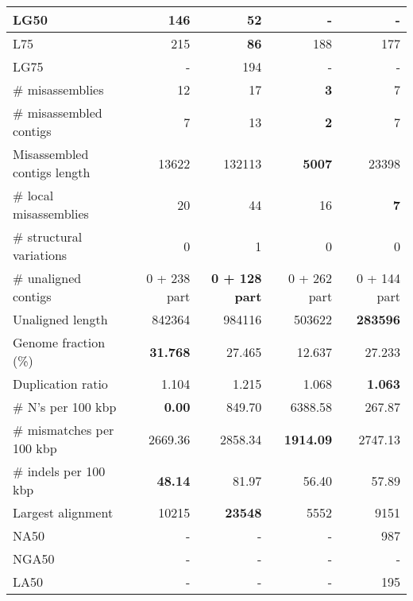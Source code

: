 \documentclass[12pt,a4paper]{article}
\begin{document}
\begin{table}[ht]
\begin{center}
\begin{tabular}{|l*{4}{|r}|}
LG50 & 146 & 52 & {\bf -} & {\bf -} \\ \hline
L75 & 215 & {\bf 86} & 188 & 177 \\ \hline
LG75 & - & 194 & - & - \\ \hline
\# misassemblies & 12 & 17 & {\bf 3} & 7 \\ \hline
\# misassembled contigs & 7 & 13 & {\bf 2} & 7 \\ \hline
Misassembled contigs length & 13622 & 132113 & {\bf 5007} & 23398 \\ \hline
\# local misassemblies & 20 & 44 & 16 & {\bf 7} \\ \hline
\# structural variations & 0 & 1 & 0 & 0 \\ \hline
\# unaligned contigs & 0 + 238 part & {\bf 0 + 128 part} & 0 + 262 part & 0 + 144 part \\ \hline
Unaligned length & 842364 & 984116 & 503622 & {\bf 283596} \\ \hline
Genome fraction (\%) & {\bf 31.768} & 27.465 & 12.637 & 27.233 \\ \hline
Duplication ratio & 1.104 & 1.215 & 1.068 & {\bf 1.063} \\ \hline
\# N's per 100 kbp & {\bf 0.00} & 849.70 & 6388.58 & 267.87 \\ \hline
\# mismatches per 100 kbp & 2669.36 & 2858.34 & {\bf 1914.09} & 2747.13 \\ \hline
\# indels per 100 kbp & {\bf 48.14} & 81.97 & 56.40 & 57.89 \\ \hline
Largest alignment & 10215 & {\bf 23548} & 5552 & 9151 \\ \hline
NA50 & - & - & - & 987 \\ \hline
NGA50 & - & - & - & - \\ \hline
LA50 & - & - & - & 195 \\ \hline
\end{tabular}
\end{center}
\end{table}
\end{document}
